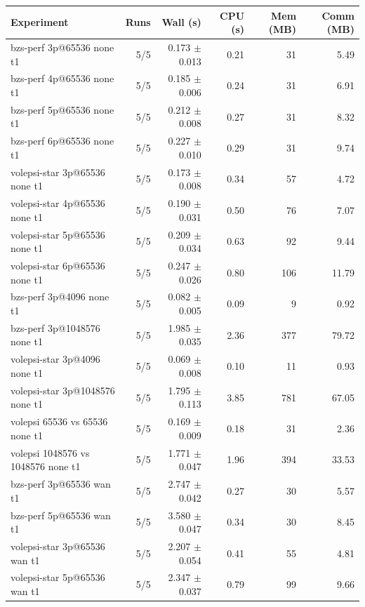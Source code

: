 \begin{tabular}{lrrrrr}
\toprule
Experiment & Runs & Wall (s) & CPU (s) & Mem (MB) & Comm (MB) \\
\midrule
bzs-perf 3p@65536 none t1 & 5/5 & 0.173 $\pm$ 0.013 & 0.21 & 31 & 5.49 \\
bzs-perf 4p@65536 none t1 & 5/5 & 0.185 $\pm$ 0.006 & 0.24 & 31 & 6.91 \\
bzs-perf 5p@65536 none t1 & 5/5 & 0.212 $\pm$ 0.008 & 0.27 & 31 & 8.32 \\
bzs-perf 6p@65536 none t1 & 5/5 & 0.227 $\pm$ 0.010 & 0.29 & 31 & 9.74 \\
volepsi-star 3p@65536 none t1 & 5/5 & 0.173 $\pm$ 0.008 & 0.34 & 57 & 4.72 \\
volepsi-star 4p@65536 none t1 & 5/5 & 0.190 $\pm$ 0.031 & 0.50 & 76 & 7.07 \\
volepsi-star 5p@65536 none t1 & 5/5 & 0.209 $\pm$ 0.034 & 0.63 & 92 & 9.44 \\
volepsi-star 6p@65536 none t1 & 5/5 & 0.247 $\pm$ 0.026 & 0.80 & 106 & 11.79 \\
bzs-perf 3p@4096 none t1 & 5/5 & 0.082 $\pm$ 0.005 & 0.09 & 9 & 0.92 \\
bzs-perf 3p@1048576 none t1 & 5/5 & 1.985 $\pm$ 0.035 & 2.36 & 377 & 79.72 \\
volepsi-star 3p@4096 none t1 & 5/5 & 0.069 $\pm$ 0.008 & 0.10 & 11 & 0.93 \\
volepsi-star 3p@1048576 none t1 & 5/5 & 1.795 $\pm$ 0.113 & 3.85 & 781 & 67.05 \\
volepsi 65536 vs 65536 none t1 & 5/5 & 0.169 $\pm$ 0.009 & 0.18 & 31 & 2.36 \\
volepsi 1048576 vs 1048576 none t1 & 5/5 & 1.771 $\pm$ 0.047 & 1.96 & 394 & 33.53 \\
bzs-perf 3p@65536 wan t1 & 5/5 & 2.747 $\pm$ 0.042 & 0.27 & 30 & 5.57 \\
bzs-perf 5p@65536 wan t1 & 5/5 & 3.580 $\pm$ 0.047 & 0.34 & 30 & 8.45 \\
volepsi-star 3p@65536 wan t1 & 5/5 & 2.207 $\pm$ 0.054 & 0.41 & 55 & 4.81 \\
volepsi-star 5p@65536 wan t1 & 5/5 & 2.347 $\pm$ 0.037 & 0.79 & 99 & 9.66 \\
\bottomrule
\end{tabular}
